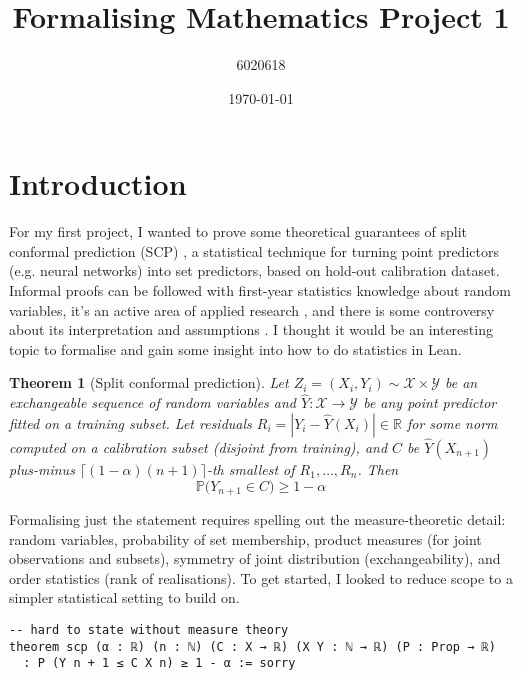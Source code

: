 \documentclass[a4paper, 12pt]{article}
\newtheorem{theorem}{Theorem}
\def\P{\mathbb{P}}
\begin{document}
\title{
  Formalising Mathematics Project 1
}
\author{6020618}
\date{\today}
\maketitle

\section*{Introduction}

For my first project, I wanted to prove
some theoretical guarantees of split conformal prediction (SCP)
\cite{vovk_conditional_2012,angelopoulos_conformal_2023},
a statistical technique for turning point predictors (e.g. neural networks)
into set predictors, based on hold-out calibration dataset.
Informal proofs can be followed with first-year statistics knowledge
about random variables, it's an active area of applied research
\cite{yang_object_2023,zhang_champ_2024,timans_adaptive_2024,parente_conformalized_2023,feldman_learning_2025,quach_conformal_2024},
and there is some controversy about its interpretation and assumptions
\cite{recht_cover_2024,hullman_conformal_2024}.
I thought it would be an interesting topic to formalise
and gain some insight into how to do statistics in Lean.

\begin{theorem}[Split conformal prediction]
  \label{scp}
  Let $Z_i=(X_i, Y_i)\sim \mathcal{X}\times\mathcal{Y}$
  be an exchangeable sequence of random variables
  and $\hat{Y}\colon \mathcal{X} \to \mathcal{Y}$
  be any point predictor fitted on a training subset.
  Let residuals $R_i=|Y_i-\hat{Y}(X_i)|\in\mathbb{R}$ for some norm
  computed on a calibration subset (disjoint from training),
  and $C$ be $\hat{Y}(X_{n+1})$ plus-minus $\lceil (1-\alpha)(n+1) \rceil$-th
  smallest of $R_1,\ldots,R_n$. Then
  \begin{equation}
    \label{mc_split}
    \P\big( Y_{n+1} \in C \big) \ge 1-\alpha
  \end{equation}
\end{theorem}

Formalising just the statement requires
spelling out the measure-theoretic detail:
random variables, probability of set membership,
product measures (for joint observations and subsets),
symmetry of joint distribution (exchangeability),
and order statistics (rank of realisations).
To get started, I looked to reduce scope
to a simpler statistical setting to build on.

\begin{lstlisting}
-- hard to state without measure theory
theorem scp (α : ℝ) (n : ℕ) (C : X → ℝ) (X Y : ℕ → ℝ) (P : Prop → ℝ)
  : P (Y n + 1 ≤ C X n) ≥ 1 - α := sorry
\end{lstlisting}
\end{document}
